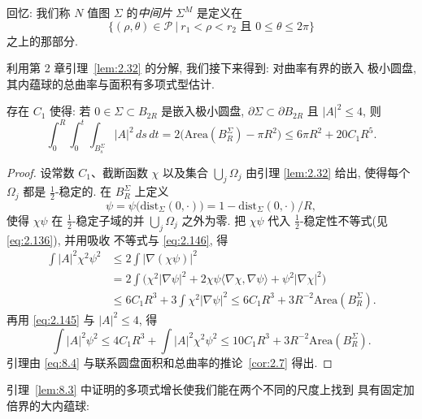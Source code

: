 回忆: 我们称 $N$ 值图 $\Sigma$ 的\emph{中间片} $\Sigma^M$ 是定义在
\begin{equation}
\bigl\{(\rho,\theta)\in\mathcal P\ \big|\ r_1<\rho<r_2
\text{ 且 } 0\leq\theta\leq 2\pi\bigr\}
\label{eq:8.1}
\end{equation}
之上的那部分.

利用第 2 章引理~\ref{lem:2.32} 的分解, 我们接下来得到: 对曲率有界的嵌入
极小圆盘, 其内蕴球的总曲率与面积有多项式型估计.

\begin{lemma}
\label{lem:8.3}
存在 $C_1$ 使得: 若 $0\in\Sigma\subset B_{2R}$ 是嵌入极小圆盘,
$\partial\Sigma\subset\partial B_{2R}$ 且 $|A|^2\leq 4$, 则
\begin{equation}
\int_0^R\int_0^t\int_{B_s^\Sigma}|A|^2\,ds\,dt
=2\bigl(\mathrm{Area}(B_R^\Sigma)-\pi R^2\bigr)
\leq 6\pi R^2+20C_1R^5.
\label{eq:8.2}
\end{equation}
\end{lemma}

\begin{proof}
设常数 $C_1$、截断函数 $\chi$ 以及集合 $\bigcup_j\Omega_j$ 由引理
\ref{lem:2.32} 给出, 使得每个 $\Omega_j$ 都是 $\frac12$-稳定的. 在
$B_R^\Sigma$ 上定义
\[
\psi=\psi\bigl(\mathrm{dist}_\Sigma(0,\cdot)\bigr)
=1-\mathrm{dist}_\Sigma(0,\cdot)/R,
\]
使得 $\chi\psi$ 在 $\frac12$-稳定子域的并 $\bigcup_j\Omega_j$ 之外为零.
把 $\chi\psi$ 代入 $\frac12$-稳定性不等式(见 \eqref{eq:2.136}), 并用吸收
不等式与 \eqref{eq:2.146}, 得
\begin{equation}
\begin{aligned}
\int|A|^2\chi^2\psi^2
&\leq 2\int|\nabla(\chi\psi)|^2\\
&=2\int\bigl(\chi^2|\nabla\psi|^2
+2\chi\psi\langle\nabla\chi,\nabla\psi\rangle
+\psi^2|\nabla\chi|^2\bigr)\\
&\leq 6C_1R^3+3\int\chi^2|\nabla\psi|^2
\leq 6C_1R^3+3R^{-2}\mathrm{Area}(B_R^\Sigma).
\label{eq:8.3}
\end{aligned}
\end{equation}
再用 \eqref{eq:2.145} 与 $|A|^2\leq 4$, 得
\begin{equation}
\int|A|^2\psi^2\leq 4C_1R^3+\int|A|^2\chi^2\psi^2
\leq 10C_1R^3+3R^{-2}\mathrm{Area}(B_R^\Sigma).
\label{eq:8.4}
\end{equation}
引理由 \eqref{eq:8.4} 与联系圆盘面积和总曲率的推论~\ref{cor:2.7} 得出.
\end{proof}

引理~\ref{lem:8.3} 中证明的多项式增长使我们能在两个不同的尺度上找到
具有固定加倍界的大内蕴球:

